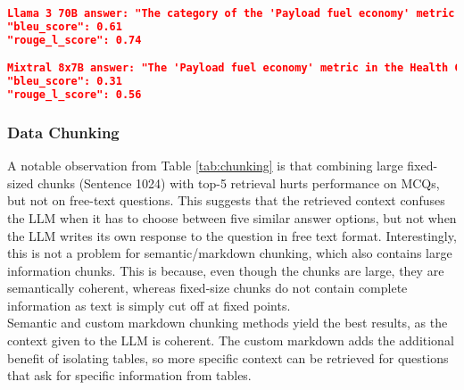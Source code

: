 \begin{lstlisting}[language=json,firstnumber=1,label={lst:models_qa_example},caption={Example local multi-hop question with RAG answers using different models}]
Llama 3 70B answer: "The category of the 'Payload fuel economy' metric in the Health Care Distributors industry is HC-DI-110a.1. This metric should be calculated as total gallons of fuel consumed divided by revenue tons miles (RTM), where revenue ton miles (RTM) equals total weight of paid tonnage transported (payload) multiplied by total distance in miles goods were transported."
"bleu_score": 0.61
"rouge_l_score": 0.74

Mixtral 8x7B answer: "The 'Payload fuel economy' metric in the Health Care Distributors industry falls under the category of Fleet Fuel Management. This metric should be calculated as the total gallons of fuel consumed divided by revenue tons miles (RTM), where RTM is equal to the total weight of paid tonnage transported (payload) multiplied by the total distance in miles goods were transported. Payload includes the weight of paid tonnage and excludes the vehicle weight. The entity should aggregate payload fuel economy for different types of transportation, including air, marine, rail, and road transportation."
"bleu_score": 0.31
"rouge_l_score": 0.56
\end{lstlisting}



\subsubsection{Data Chunking} \label{chunking_discussion}

A notable observation from Table \ref{tab:chunking} is that combining large fixed-sized chunks (Sentence 1024) with top-5 retrieval hurts performance on MCQs, but not on free-text questions. This suggests that the retrieved context confuses the LLM when it has to choose between five similar answer options, but not when the LLM writes its own response to the question in free text format. Interestingly, this is not a problem for semantic/markdown chunking, which also contains large information chunks. This is because, even though the chunks are large, they are semantically coherent, whereas fixed-size chunks do not contain complete information as text is simply cut off at fixed points. \\

Semantic and custom markdown chunking methods yield the best results, as the context given to the LLM is coherent. The custom markdown adds the additional benefit of isolating tables, so more specific context can be retrieved for questions that ask for specific information from tables.



